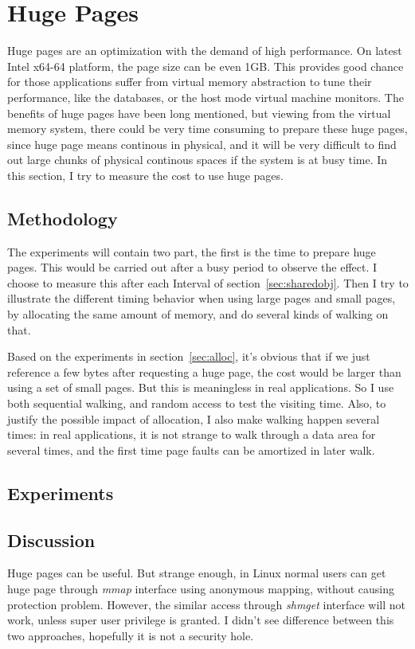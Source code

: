 \section{Huge Pages}
	\label{sec:hugepage}
Huge pages are an optimization with the demand of high performance. On latest
Intel x64-64 platform, the page size can be even 1GB. This provides good
chance for those applications suffer from virtual memory abstraction to tune
their performance, like the databases, or the host mode virtual machine monitors.
The benefits of huge pages have been long mentioned, but viewing from the
virtual memory system, there could be very time consuming to prepare these
huge pages, since huge page means continous in physical, and it will be very
difficult to find out large chunks of physical continous spaces if the system is
at busy time. In this section, I try to measure the cost to use huge pages.

\subsection{Methodology}
The experiments will contain two part, the first is the time to prepare huge
pages. This would be carried out after a busy period to observe the effect. I
choose to measure this after each Interval of section~\ref{sec:sharedobj}. Then
I try to illustrate the different timing behavior when using large pages and
small pages, by allocating the same amount of memory, and do several kinds of
walking on that.

Based on the experiments in section~\ref{sec:alloc}, it's obvious that if we
just reference a few bytes after requesting a huge page, the cost would be
larger than using a set of small pages. But this is meaningless in real
applications. So I use both sequential walking, and random access to test
the visiting time. Also, to justify the possible impact of allocation, I
also make walking happen several times: in real applications, it is not
strange to walk through a data area for several times, and the first time
page faults can be amortized in later walk.

\subsection{Experiments}

\subsection{Discussion}
Huge pages can be useful. But strange enough, in Linux normal users can get
huge page through \emph{mmap} interface using anonymous mapping, without
causing protection problem.  However, the similar access through \emph{shmget}
interface will not work, unless super user privilege is granted. I didn't 
see difference between this two approaches, hopefully it is not a security
hole.
